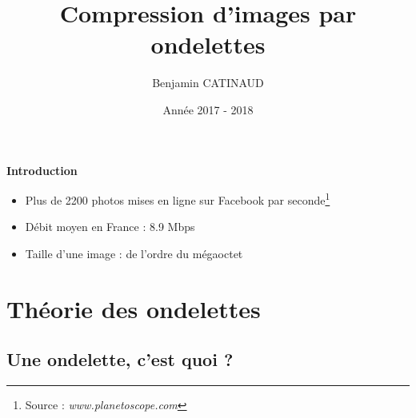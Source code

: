 \documentclass[10pt]{beamer}
\title[Compression par ondelettes]{Compression d'images par ondelettes}
\author{Benjamin CATINAUD}
\date{Ann\'{e}e 2017 - 2018}
\begin{document}
  \frame{\titlepage}
  
  \begin{frame}
   \centering
   \textbf{\LARGE Introduction}
   
   \begin{itemize}
    \item Plus de 2200 photos mises en ligne sur Facebook par seconde\footnote{\tiny Source : \textit{www.planetoscope.com}}
    \item D\'{e}bit moyen en France : 8.9 Mbps
    \item Taille d'une image : de l'ordre du m\'{e}gaoctet
   \end{itemize}

  \end{frame}

  
  \begin{frame}
    \tableofcontents
  \end{frame}
  
  \section{Th\'{e}orie des ondelettes}
  
    \subsection{Une ondelette, c'est quoi ?}
    
\end{document}
